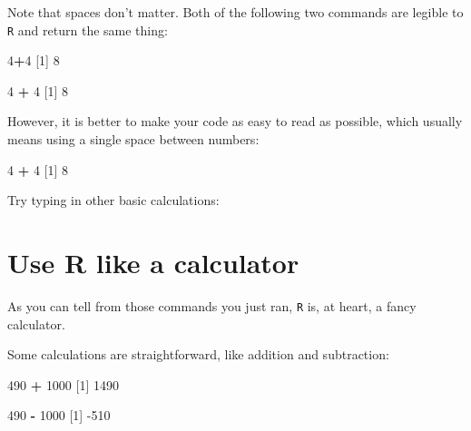 \documentclass[]{book}
\newenvironment{Shaded}{\begin{snugshade}}{\end{snugshade}}
\newcommand{\DecValTok}[1]{\textcolor[rgb]{0.00,0.00,0.81}{#1}}
\newcommand{\NormalTok}[1]{#1}
\newcommand{\OperatorTok}[1]{\textcolor[rgb]{0.81,0.36,0.00}{\textbf{#1}}}
\newcommand{\StringTok}[1]{\textcolor[rgb]{0.31,0.60,0.02}{#1}}
\begin{document}
Note that spaces don't matter. Both of the following two commands are legible to \texttt{R} and return the same thing:

\begin{Shaded}
\begin{Highlighting}[]
\DecValTok{4}\OperatorTok{+}\DecValTok{4}
\NormalTok{[}\DecValTok{1}\NormalTok{] }\DecValTok{8}
\end{Highlighting}
\end{Shaded}

\begin{Shaded}
\begin{Highlighting}[]
\DecValTok{4}        \OperatorTok{+}\StringTok{        }\DecValTok{4}
\NormalTok{[}\DecValTok{1}\NormalTok{] }\DecValTok{8}
\end{Highlighting}
\end{Shaded}

However, it is better to make your code as easy to read as possible, which usually means using a single space between numbers:

\begin{Shaded}
\begin{Highlighting}[]
\DecValTok{4} \OperatorTok{+}\StringTok{ }\DecValTok{4}
\NormalTok{[}\DecValTok{1}\NormalTok{] }\DecValTok{8}
\end{Highlighting}
\end{Shaded}

Try typing in other basic calculations:

\hypertarget{use-r-like-a-calculator}{%
\section*{Use R like a calculator}\label{use-r-like-a-calculator}}

As you can tell from those commands you just ran, \texttt{R} is, at heart, a fancy calculator.

Some calculations are straightforward, like addition and subtraction:

\begin{Shaded}
\begin{Highlighting}[]
\DecValTok{490} \OperatorTok{+}\StringTok{ }\DecValTok{1000}
\NormalTok{[}\DecValTok{1}\NormalTok{] }\DecValTok{1490}
\end{Highlighting}
\end{Shaded}

\begin{Shaded}
\begin{Highlighting}[]
\DecValTok{490} \OperatorTok{-}\StringTok{ }\DecValTok{1000}
\NormalTok{[}\DecValTok{1}\NormalTok{] }\DecValTok{-510}
\end{Highlighting}
\end{Shaded}
\end{document}
